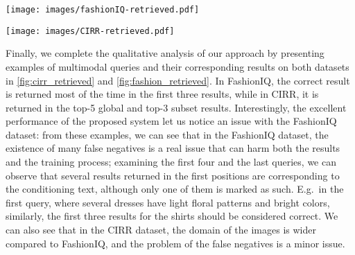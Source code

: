 \documentclass[acmlarge]{acmart}
\begin{document}
\begin{figure*}[!htb]
    \centering
    \texttt{[image: images/fashionIQ-retrieved.pdf]}
    \caption{Qualitative results for the FashionIQ dataset. We highlight with a green border when the retrieved image is labeled as ground truth for the given query.}
    \label{fig:fashion_retrieved}
    \vspace{-2ex}
\end{figure*}

\begin{figure*}[!htb]
    \centering
    \texttt{[image: images/CIRR-retrieved.pdf]}
    \caption{Qualitative results for the CIRR dataset. We highlight with a green border when the retrieved image is labeled as ground truth for the given query.}
    \label{fig:cirr_retrieved}
    \vspace{-2ex}
\end{figure*}


Finally, we complete the qualitative analysis of our approach by presenting examples of multimodal queries and their corresponding results on both datasets in \cref{fig:cirr_retrieved} and \cref{fig:fashion_retrieved}. In FashionIQ, the correct result is returned most of the time in the first three results, while in CIRR, it is returned in the top-5 global and top-3 subset results.
Interestingly, the excellent performance of the proposed system let us notice an issue with the FashionIQ dataset: from these examples, we can see that in the FashionIQ dataset, the existence of many false negatives is a real issue that can harm both the results and the training process; examining the first four and the last queries, we can observe that several results returned in the first positions are corresponding to the conditioning text, although only one of them is marked as such. E.g.~in the first query, where several dresses have light floral patterns and bright colors, similarly, the first three results for the shirts should be considered correct. 
We can also see that in the CIRR dataset, the domain of the images is wider compared to FashionIQ, and the problem of the false negatives is a minor issue. 
\end{document}
